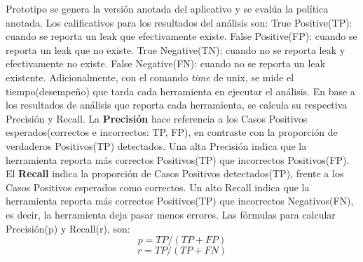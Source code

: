 Prototipo se genera la versión anotada del aplicativo y se evalúa la política
anotada.\newline
Los calificativos para los resultados del análisis son:  
True Positive(TP): cuando se reporta un leak que efectivamente existe. 
False Positive(FP): cuando se reporta un leak que no existe.  
True Negative(TN): cuando no se reporta leak y efectivamente no existe. 
False Negative(FN): cuando no se reporta un leak existente.\newline
Adicionalmente, con el comando \textit{time}\cite{time-man} de unix, se mide el
tiempo(desempeño) que tarda cada herramienta en ejecutar el análisis.\newline
En base a los resultados de análisis que reporta cada herramienta, se
calcula su respectiva Precisión y Recall.\newline
La \textbf{Precisión} hace referencia a los Casos Positivos esperados(correctos
e incorrectos: TP, FP), en contraste con la proporción de verdaderos Positivos(TP)
detectados\cite{Precision-Recall}. Una alta Precisión indica que la herramienta
reporta más correctos Positivos(TP) que incorrectos Positivos(FP).\newline 
El \textbf{Recall} indica la proporción de Casos Positivos detectados(TP),
frente a los Casos Positivos esperados como correctos\cite{Precision-Recall}. Un
alto Recall indica que la herramienta reporta más correctos Positivos(TP) que incorrectos
Negativos(FN), es decir, la herramienta deja pasar menos errores.\newline
Las fórmulas para calcular Precisión(p) y Recall(r), son:
\begin{equation}
\label{pre}
	p = TP/(TP +FP) 
\end{equation}
\begin{equation}
\label{rec}
	r = TP/(TP+FN)
\end{equation}
